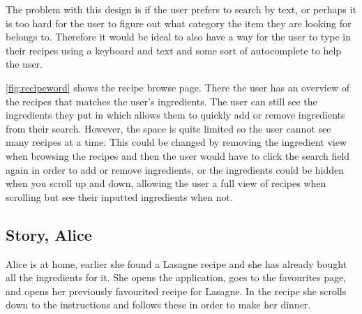 The problem with this design is if the user prefers to search by text, or perhaps it is too hard for the user to figure out what category the item they are looking for belongs to. Therefore it would be ideal to also have a way for the user to type in their recipes using a keyboard and text and some sort of autocomplete to help the user.

\autoref{fig:recipeword} shows the recipe browse page. There the user has an overview of the recipes that matches the user's ingredients. The user can still see the ingredients they put in which allows them to quickly add or remove ingredients from their search. However, the space is quite limited so the user cannot see many recipes at a time. This could be changed by removing the ingredient view when browsing the recipes and then the user would have to click the search field again in order to add or remove ingredients, or the ingredients could be hidden when you scroll up and down, allowing the user a full view of recipes when scrolling but see their inputted ingredients when not.

\subsection*{Story, Alice}

Alice is at home, earlier she found a Lasagne recipe and she has already bought all the ingredients for it. She opens the application, goes to the favourites page, and opens her previously favourited recipe for Lasagne. In the recipe she scrolls down to the instructions and follows these in order to make her dinner.


